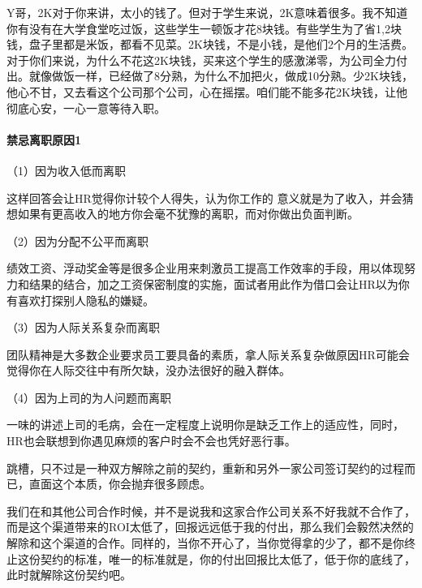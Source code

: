 \documentclass[letterpaper,11pt,english]{sphinxmanual}
\begin{document}
Y哥，2K对于你来讲，太小的钱了。但对于学生来说，2K意味着很多。我不知道你有没有在大学食堂吃过饭，这些学生一顿饭才花8块钱。有些学生为了省1,2块钱，盘子里都是米饭，都看不见菜。2K块钱，不是小钱，是他们2个月的生活费。对于你们来说，为什么不花这2K块钱，买来这个学生的感激涕零，为公司全力付出。就像做饭一样，已经做了8分熟，为什么不加把火，做成10分熟。少2K块钱，他心不甘，又去看这个公司那个公司，心在摇摆。咱们能不能多花2K块钱，让他彻底心安，一心一意等待入职。%
\begin{footnote}[779]\sphinxAtStartFootnote
{}
%
\end{footnote}


\paragraph{禁忌离职原因1\sphinxfootnotemark[780]}
\label{\detokenize{chapter_interview/HR:id8}}%
\begin{footnotetext}[780]\sphinxAtStartFootnote
{}
%
\end{footnotetext}\ignorespaces 
（1）因为收入低而离职

这样回答会让HR觉得你计较个人得失，认为你工作的
意义就是为了收入，并会猜想如果有更高收入的地方你会毫不犹豫的离职，而对你做出负面判断。

（2）因为分配不公平而离职

绩效工资、浮动奖金等是很多企业用来刺激员工提高工作效率的手段，用以体现努力和结果的结合，加之工资保密制度的实施，面试者用此作为借口会让HR以为你有喜欢打探别人隐私的嫌疑。

（3）因为人际关系复杂而离职

团队精神是大多数企业要求员工要具备的素质，拿人际关系复杂做原因HR可能会觉得你在人际交往中有所欠缺，没办法很好的融入群体。

（4）因为上司的为人问题而离职

一味的讲述上司的毛病，会在一定程度上说明你是缺乏工作上的适应性，同时，HR也会联想到你遇见麻烦的客户时会不会也凭好恶行事。

跳槽，只不过是一种双方解除之前的契约，重新和另外一家公司签订契约的过程而已，直面这个本质，你会抛弃很多顾虑。

我们在和其他公司合作时候，并不是说我和这家合作公司关系不好我就不合作了，而是这个渠道带来的ROI太低了，回报远远低于我的付出，那么我们会毅然决然的解除和这个渠道的合作。同样的，当你不开心了，当你觉得拿的少了，都不是你终止这份契约的标准，唯一的标准就是，你的付出回报比太低了，低于你的底线了，此时就解除这份契约吧。%
\begin{footnote}[781]\sphinxAtStartFootnote
{}
%
\end{footnote}
\end{document}
